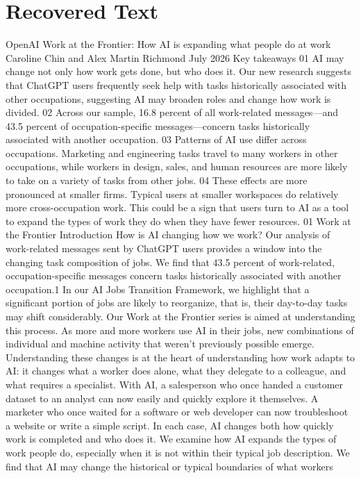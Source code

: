 \section{Recovered Text}
OpenAI
Work at the Frontier:
How AI is expanding
what people do at work
Caroline Chin and Alex Martin Richmond
July 2026
Key takeaways
01
AI may change not only how work gets done, but who does it. Our new research
suggests that ChatGPT users frequently seek help with tasks historically
associated with other occupations, suggesting AI may broaden roles and change
how work is divided.
02
Across our sample, 16.8 percent of all work-related messages—and 43.5 percent of
occupation-specific messages—concern tasks historically associated with another
occupation.
03
Patterns of AI use differ across occupations. Marketing and engineering tasks
travel to many workers in other occupations, while workers in design, sales, and
human resources are more likely to take on a variety of tasks from other jobs.
04
These effects are more pronounced at smaller firms. Typical users at smaller
workspaces do relatively more cross-occupation work. This could be a sign that
users turn to AI as a tool to expand the types of work they do when they have fewer
resources.
01
Work at the Frontier
Introduction
How is AI changing how we work? Our analysis of work-related messages sent by ChatGPT users
provides a window into the changing task composition of jobs. We find that 43.5 percent of work-related,
occupation-specific messages concern tasks historically associated with another occupation.1
In our AI Jobs Transition Framework, we highlight that a significant portion of jobs are likely to reorganize,
that is, their day-to-day tasks may shift considerably. Our Work at the Frontier series is aimed at
understanding this process. As more and more workers use AI in their jobs, new combinations of
individual and machine activity that weren’t previously possible emerge. Understanding these changes
is at the heart of understanding how work adapts to AI: it changes what a worker does alone, what they
delegate to a colleague, and what requires a specialist.
With AI, a salesperson who once handed a customer dataset to an analyst can now easily and quickly
explore it themselves. A marketer who once waited for a software or web developer can now troubleshoot
a website or write a simple script. In each case, AI changes both how quickly work is completed and who
does it. We examine how AI expands the types of work people do, especially when it is not within their
typical job description. We find that AI may change the historical or typical boundaries of what workers
